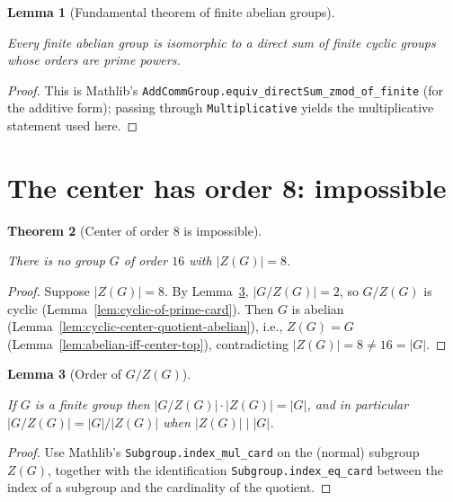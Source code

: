 \documentclass{article}
\newtheorem{theorem}{Theorem}[section]
\newtheorem{lemma}[theorem]{Lemma}
\theoremstyle{definition}
\newcommand{\lean}[1]{}
\newcommand{\leanok}{}
\newcommand{\leanfile}[1]{}
\newcommand{\uses}[1]{}
\begin{document}
\begin{lemma}[Fundamental theorem of finite abelian groups]
    \label{lem:fundamental-finite-abelian}
    \lean{OrderSixteen.Prelim.fundamental_finite_abelian}
    \leanfile{M2rGroup7/SixteenCase.lean}
    \leanok
    Every finite abelian group is isomorphic to a direct sum of finite cyclic
    groups whose orders are prime powers.
\end{lemma}
\begin{proof}
    This is Mathlib's \texttt{AddCommGroup.equiv\_directSum\_zmod\_of\_finite}
    (for the additive form); passing through \texttt{Multiplicative} yields
    the multiplicative statement used here.
\end{proof}

\section{The center has order 8: impossible}

\begin{theorem}[Center of order 8 is impossible]
    \label{thm:center-eight}
    \lean{OrderSixteen.center_order_eight}
    \leanfile{M2rGroup7/SixteenCase.lean}
    \uses{lem:cyclic-center-quotient-abelian, lem:abelian-iff-center-top, lem:quotient-by-center-card}
    \leanok
    There is no group $G$ of order $16$ with $|Z(G)| = 8$.
\end{theorem}
\begin{proof}
    \uses{lem:cyclic-center-quotient-abelian,lem:abelian-iff-center-top,
          lem:quotient-by-center-card,lem:cyclic-of-prime-card}
    Suppose $|Z(G)| = 8$. By Lemma~\ref{lem:quotient-by-center-card},
    $|G/Z(G)| = 2$, so $G/Z(G)$ is cyclic
    (Lemma~\ref{lem:cyclic-of-prime-card}). Then $G$ is abelian
    (Lemma~\ref{lem:cyclic-center-quotient-abelian}), i.e., $Z(G) = G$
    (Lemma~\ref{lem:abelian-iff-center-top}), contradicting $|Z(G)| = 8 \ne
    16 = |G|$.
\end{proof}

\begin{lemma}[Order of $G/Z(G)$]
    \label{lem:quotient-by-center-card}
    \lean{OrderSixteen.Prelim.quotient_by_center_card}
    \leanfile{M2rGroup7/SixteenCase.lean}
    \leanok
    If $G$ is a finite group then $|G/Z(G)| \cdot |Z(G)| = |G|$, and in
    particular $|G/Z(G)| = |G|/|Z(G)|$ when $|Z(G)| \mid |G|$.
\end{lemma}
\begin{proof}
    Use Mathlib's \texttt{Subgroup.index\_mul\_card} on the (normal) subgroup
    $Z(G)$, together with the identification
    \texttt{Subgroup.index\_eq\_card} between the index of a subgroup and the
    cardinality of the quotient.
\end{proof}
\end{document}
